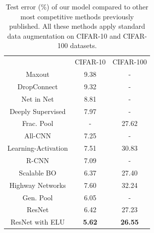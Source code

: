 \documentclass[10pt,twocolumn,letterpaper]{article}
\begin{document}
\setlength{\tabcolsep}{4pt}
\begin{table}
    \centering
    \caption{Test error (\%) of our model compared to other most competitive methods previously published. All these methods apply standard data augmentation on CIFAR-10 and CIFAR-100 datasets.}
    \label{table:CifarDatasetCompare}
    \begin{tabular}{c c c}
        \hline \noalign{\smallskip}
         & CIFAR-10 & CIFAR-100 \\
        \noalign{\smallskip}
        \hline
        \noalign{\smallskip}
        Maxout \cite{[20]}               &   9.38     &  -    \\
        DropConnect \cite{[19]}          &   9.32     &  -    \\
        Net in Net  \cite{[21]}          &   8.81     &  -    \\
        Deeply Supervised \cite{[18]}    &   7.97     &  -    \\
        Frac. Pool \cite{[22]}           &    -       & 27.62 \\
        All-CNN \cite{[16]}              &   7.25     &  -    \\
        Learning-Activation \cite{[23]}  &   7.51     & 30.83 \\
        R-CNN \cite{[24]}                &   7.09     &  -    \\
        Scalable BO \cite{[25]}          &   6.37     & 27.40 \\
        Highway Networks \cite{[26]}     &   7.60     & 32.24 \\
        Gen. Pool \cite{[27]}            &   6.05     &  -    \\
        \noalign{\smallskip}
        \hline
        ResNet \cite{[1]}               &   6.42     & 27.23 \\
        ResNet with ELU       &   \textbf{5.62}     & \textbf{26.55} \\
        \hline
    \end{tabular}
\end{table}
\end{document}
